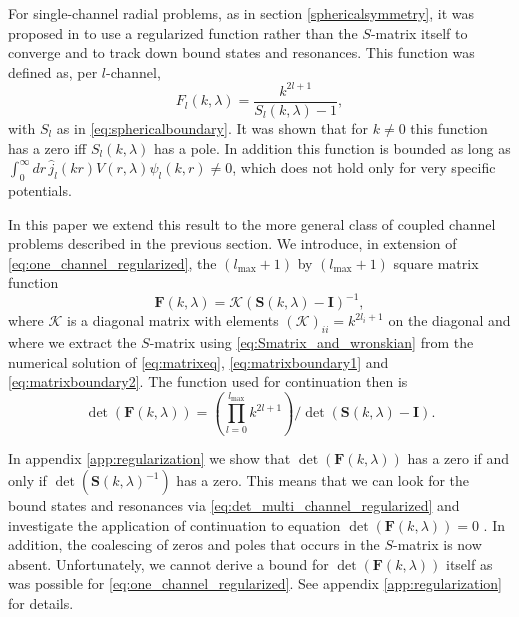 \documentclass[mathpazo]{cicp}
\begin{document}
For single-channel radial problems, as in section \ref{sphericalsymmetry}, it was proposed in \cite{Broeckhove2009} to use a regularized function rather than 
the $S$-matrix itself to converge and to track down bound states and resonances. This function was defined as, per $l$-channel,
\begin{equation}
	\label{eq:one_channel_regularized}
	F_{l}(k,\lambda) = \frac{k^{2l+1}}{S_l(k,\lambda)-1},
\end{equation}
with $S_{l}$ as in \eqref{eq:sphericalboundary}. It was shown that for $k\neq 0 $ this function has a zero iff $S_l(k,\lambda)$ has a pole. In addition this function is bounded 
as long as $\int_0^\infty dr\, \hat{j}_l(kr) V(r,\lambda) \psi_l(k,r) \neq 0$, which does not hold only for very specific potentials. 

In this paper we extend this result to the more general class of coupled channel problems described in the previous section. We introduce, in extension of \eqref{eq:one_channel_regularized}, 
the $(l_\text{max} + 1)$ by $(l_\text{max} + 1)$ square matrix function
\begin{equation}
	\label{eq:multi_channel_regularized}
	\mathbold{F}(k,\lambda) = \mathcal{K}
	\left( \mathbold{S}(k,\lambda) - \mathbold{I} \right)^{-1},
\end{equation}
where $\mathcal{K}$ is a diagonal matrix with elements $(\mathcal{K})_{ii} = k^{2l_{i}+1}$ on the diagonal and where we extract the $S$-matrix using \eqref{eq:Smatrix_and_wronskian} from the numerical solution of \eqref{eq:matrixeq}, \eqref{eq:matrixboundary1} and \eqref{eq:matrixboundary2}. The function used for continuation then is
\begin{equation}
	\label{eq:det_multi_channel_regularized}
	\det(\mathbold{F}(k,\lambda)) = \left( \prod_{l=0}^{l_{\text{max}}} k^{2l+1} \right) \bigg/ \det(\mathbold{S}(k,\lambda)-\mathbold{I}).
\end{equation}

In appendix \ref{app:regularization} we show that $\det(\mathbold{F}(k,\lambda))$ has a zero if and only if $\det(\mathbold{S}(k,\lambda)^{-1})$ has a zero. This means that we can look for the bound states and resonances via \eqref{eq:det_multi_channel_regularized} and investigate the application of continuation to equation $\det(\mathbold{F}(k,\lambda))=0$ . In addition, the coalescing of zeros and poles that occurs in the $S$-matrix is now absent. Unfortunately, we cannot derive a bound for $\det(\mathbold{F}(k,\lambda))$ itself as was possible for \eqref{eq:one_channel_regularized}. See appendix \ref{app:regularization} for details.
\end{document}
